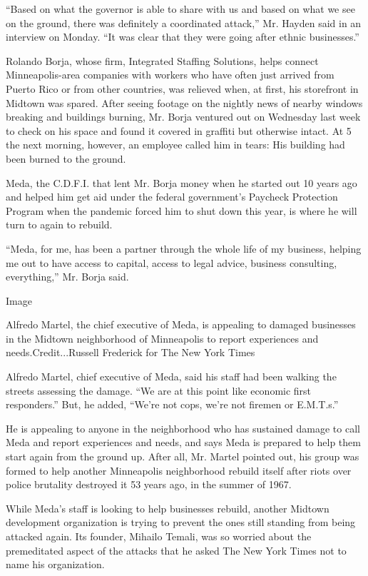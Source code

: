 ``Based on what the governor is able to share with us and based on what
we see on the ground, there was definitely a coordinated attack,'' Mr.
Hayden said in an interview on Monday. ``It was clear that they were
going after ethnic businesses.''

Rolando Borja, whose firm, Integrated Staffing Solutions, helps connect
Minneapolis-area companies with workers who have often just arrived from
Puerto Rico or from other countries, was relieved when, at first, his
storefront in Midtown was spared. After seeing footage on the nightly
news of nearby windows breaking and buildings burning, Mr. Borja
ventured out on Wednesday last week to check on his space and found it
covered in graffiti but otherwise intact. At 5 the next morning,
however, an employee called him in tears: His building had been burned
to the ground.

Meda, the C.D.F.I. that lent Mr. Borja money when he started out 10
years ago and helped him get aid under the federal government's Paycheck
Protection Program when the pandemic forced him to shut down this year,
is where he will turn to again to rebuild.

``Meda, for me, has been a partner through the whole life of my
business, helping me out to have access to capital, access to legal
advice, business consulting, everything,'' Mr. Borja said.

Image

Alfredo Martel, the chief executive of Meda, is appealing to damaged
businesses in the Midtown neighborhood of Minneapolis to report
experiences and needs.Credit...Russell Frederick for The New York Times

Alfredo Martel, chief executive of Meda, said his staff had been walking
the streets assessing the damage. ``We are at this point like economic
first responders.'' But, he added, ``We're not cops, we're not firemen
or E.M.T.s.''

He is appealing to anyone in the neighborhood who has sustained damage
to call Meda and report experiences and needs, and says Meda is prepared
to help them start again from the ground up. After all, Mr. Martel
pointed out, his group was formed to help another Minneapolis
neighborhood rebuild itself after riots over police brutality destroyed
it 53 years ago, in the summer of 1967.

While Meda's staff is looking to help businesses rebuild, another
Midtown development organization is trying to prevent the ones still
standing from being attacked again. Its founder, Mihailo Temali, was so
worried about the premeditated aspect of the attacks that he asked The
New York Times not to name his organization.

